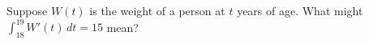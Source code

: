 \documentclass{ximera}
\begin{document}
\begin{problem}
  Suppose $W(t)$ is the weight of a person at $t$ years of age.  What
  might $\int_{18}^{19} W'(t) \, dt = 15$ mean?
  \begin{multipleChoice}
  \end{multipleChoice}
\end{problem}
\end{document}
